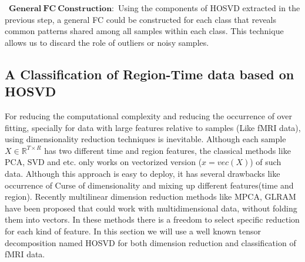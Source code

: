 \documentclass[preprint,12pt]{elsarticle}
\begin{document}
\textbullet\ $\mathbf{General~FC~Construction:}$
	Using the components of HOSVD extracted in the previous step, a general FC could be constructed for each class that reveals common patterns  shared among all samples within each class. This technique allows us to discard the role of outliers or noisy samples.  

\subsection{ A Classification of Region-Time data  based on  HOSVD}
For reducing the computational complexity and reducing the  occurrence of over fitting, specially for data with large features relative to samples (Like fMRI data), using  dimensionality reduction techniques is inevitable. Although each sample $X\in \mathbb{R}^{T\times R}$ has two different time and region features, the classical methods like PCA, SVD and etc. only  works on vectorized version ($x=vec(X)$) of such data.
Although this approach is easy to deploy, it has several drawbacks like occurrence of Curse of dimensionality and mixing up different features(time and region).
Recently multilinear dimension reduction methods like MPCA, GLRAM  have been proposed that
could work with multidimensional data, without folding them into vectors.
In these methods there is a freedom to select specific reduction for each kind of feature. In this section we will use a well known tensor decomposition named HOSVD for both dimension reduction and classification of fMRI data.
\end{document}
